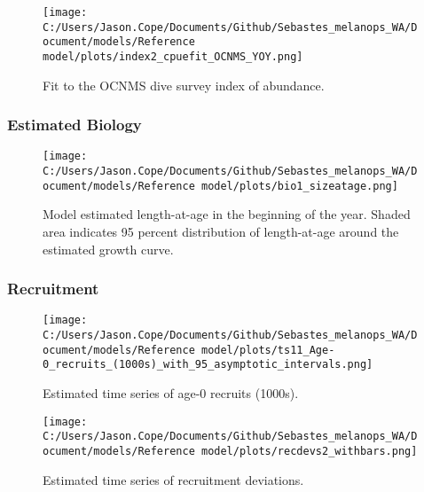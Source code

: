 \documentclass[11pt,
  english,
  letterpaper,
]{article}
\begin{document}
\pagebreak

\begin{figure}
\centering
\texttt{[image: C:/Users/Jason.Cope/Documents/Github/Sebastes\_melanops\_WA/Document/models/Reference model/plots/index2\_cpuefit\_OCNMS\_YOY.png]}
\caption{Fit to the OCNMS dive survey index of abundance.\label{fig:ocnms-yoy-index-fit}}
\end{figure}

\pagebreak

\hypertarget{estimated-biology}{%
\subsubsection{Estimated Biology}\label{estimated-biology}}

\begin{figure}
\centering
\texttt{[image: C:/Users/Jason.Cope/Documents/Github/Sebastes\_melanops\_WA/Document/models/Reference model/plots/bio1\_sizeatage.png]}
\caption{Model estimated length-at-age in the beginning of the year. Shaded area indicates 95 percent distribution of length-at-age around the estimated growth curve.\label{fig:len-age-ss}}
\end{figure}

\pagebreak

\hypertarget{recruitment-1}{%
\subsubsection{Recruitment}\label{recruitment-1}}

\begin{figure}
\centering
\texttt{[image: C:/Users/Jason.Cope/Documents/Github/Sebastes\_melanops\_WA/Document/models/Reference model/plots/ts11\_Age-0\_recruits\_(1000s)\_with\_95\_asymptotic\_intervals.png]}
\caption{Estimated time series of age-0 recruits (1000s).\label{fig:recruits}}
\end{figure}

\pagebreak

\begin{figure}
\centering
\texttt{[image: C:/Users/Jason.Cope/Documents/Github/Sebastes\_melanops\_WA/Document/models/Reference model/plots/recdevs2\_withbars.png]}
\caption{Estimated time series of recruitment deviations.\label{fig:rec-devs}}
\end{figure}
\end{document}
